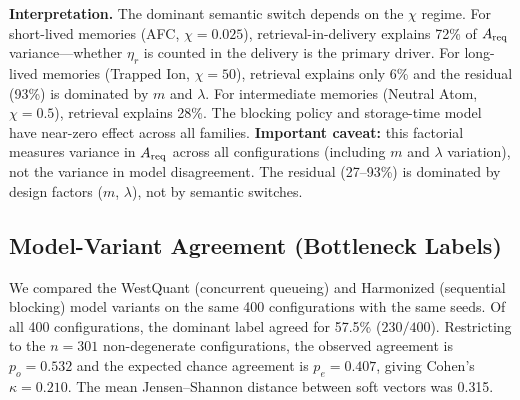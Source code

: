 \documentclass[aps,prapplied,reprint,superscriptaddress]{revtex4-2}
\begin{document}
\begin{table}[htbp]
\centering
\caption{Fraction of variance in $A_{\rm req}$ explained by each semantic switch, per family. Cluster bootstrap 95\% CI in brackets. The dominant switch depends on the $\chi$ regime: retrieval-in-delivery dominates for short-lived memories ($\chi = 0.025$), generation mode dominates for long-lived memories ($\chi = 50$).}
\label{tab:switches_variance}
\setlength{\tabcolsep}{4pt}
\end{table}

\textbf{Interpretation.} The dominant semantic switch depends on the $\chi$ regime. For short-lived memories (AFC, $\chi = 0.025$), retrieval-in-delivery explains 72\% of $A_{\rm req}$ variance---whether $\eta_r$ is counted in the delivery is the primary driver. For long-lived memories (Trapped Ion, $\chi = 50$), retrieval explains only 6\% and the residual (93\%) is dominated by $m$ and $\lambda$. For intermediate memories (Neutral Atom, $\chi = 0.5$), retrieval explains 28\%. The blocking policy and storage-time model have near-zero effect across all families. \textbf{Important caveat:} this factorial measures variance in $A_{\rm req}$ across all configurations (including $m$ and $\lambda$ variation), not the variance in model disagreement. The residual (27--93\%) is dominated by design factors ($m$, $\lambda$), not by semantic switches.

\subsection{Model-Variant Agreement (Bottleneck Labels)}

We compared the WestQuant (concurrent queueing) and Harmonized (sequential blocking) model variants on the same 400 configurations with the same seeds. Of all 400 configurations, the dominant label agreed for 57.5\% ($230/400$). Restricting to the $n = 301$ non-degenerate configurations, the observed agreement is $p_o = 0.532$ and the expected chance agreement is $p_e = 0.407$, giving Cohen's $\kappa = 0.210$. The mean Jensen--Shannon distance between soft vectors was 0.315.
\end{document}
